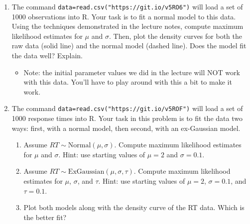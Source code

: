 \documentclass[10pt]{article}
\begin{document}
\begin{enumerate}
 \item The command \verb|data=read.csv("https://git.io/v5RO6")| will load a set of 1000 observations into R.  Your task is to fit a normal model to this data.  Using the techniques demonstrated in the lecture notes, compute maximum likelihood estimates for $\mu$ and $\sigma$.  Then, plot the density curves for both the raw data (solid line) and the normal model (dashed line).  Does the model fit the data well?  Explain.

   \begin{itemize}
   \item Note: the initial parameter values we did in the lecture will NOT work with this data.  You'll have to play around with this a bit to make it work.
   \end{itemize}


 \item The command \verb|data=read.csv("https://git.io/v5ROF")| will load a set of 1000 response times into R.  Your task in this problem is to fit the data two ways: first, with a normal model, then second, with an ex-Gaussian model.

   \begin{enumerate}
   \item Assume $RT \sim \text{Normal}(\mu,\sigma)$.  Compute maximum likelihood estimates for $\mu$ and $\sigma$.  Hint: use starting values of $\mu=2$ and $\sigma=0.1$.

   \item Assume $RT \sim \text{ExGaussian}(\mu,\sigma,\tau)$.  Compute maximum likelihood estimates for $\mu$, $\sigma$, and $\tau$.  Hint: use starting values of $\mu=2$, $\sigma=0.1$, and $\tau=0.1$.

     \item Plot both models along with the density curve of the RT data.  Which is the better fit?
   \end{enumerate}
  \end{enumerate}
\end{document}
